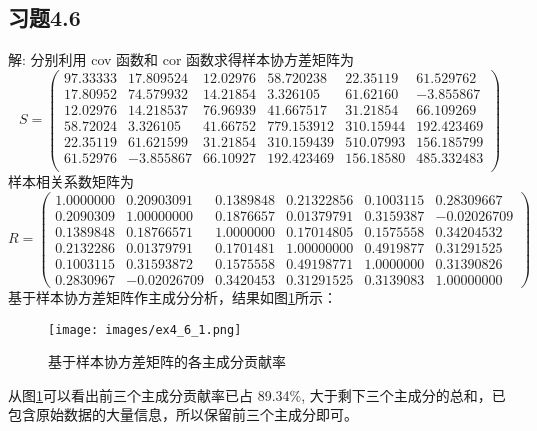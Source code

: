\documentclass{ctexrep}
\begin{document}
\subsection*{习题4.6}
解: 分别利用 cov 函数和 cor 函数求得样本协方差矩阵为
\begin{equation*}
S=\begin{pmatrix}
97.33333 & 17.809524 & 12.02976 & 58.720238 & 22.35119 & 61.529762 \\
17.80952 & 74.579932 & 14.21854 & 3.326105 & 61.62160 & -3.855867 \\
12.02976 & 14.218537 & 76.96939 & 41.667517 & 31.21854 & 66.109269 \\
58.72024 & 3.326105 & 41.66752 & 779.153912 & 310.15944 & 192.423469 \\
22.35119 & 61.621599 & 31.21854 & 310.159439 & 510.07993 & 156.185799 \\
61.52976 & -3.855867 & 66.10927 & 192.423469 & 156.18580 & 485.332483 \\
\end{pmatrix}
\end{equation*}
样本相关系数矩阵为
\begin{equation*}
R=\begin{pmatrix}
1.0000000 & 0.20903091 & 0.1389848 & 0.21322856 & 0.1003115 & 0.28309667 \\
0.2090309 & 1.00000000 & 0.1876657 & 0.01379791 & 0.3159387 & -0.02026709 \\
0.1389848 & 0.18766571 & 1.0000000 & 0.17014805 & 0.1575558 & 0.34204532 \\
0.2132286 & 0.01379791 & 0.1701481 & 1.00000000 & 0.4919877 & 0.31291525 \\
0.1003115 & 0.31593872 & 0.1575558 & 0.49198771 & 1.0000000 & 0.31390826 \\
0.2830967 & -0.02026709 & 0.3420453 & 0.31291525 & 0.3139083 & 1.00000000
\end{pmatrix}
\end{equation*}
基于样本协方差矩阵作主成分分析，结果如图\ref{fig:ex461}所示：
\begin{figure}[ht!]
\begin{center}
\texttt{[image: images/ex4\_6\_1.png]}
\end{center}
\caption{基于样本协方差矩阵的各主成分贡献率}
\label{fig:ex461}
\end{figure}

从图\ref{fig:ex461}可以看出前三个主成分贡献率已占 89.34\%, 大于剩下三个主成分的总和，已包含原始数据的大量信息，所以保留前三个主成分即可。
\end{document}

